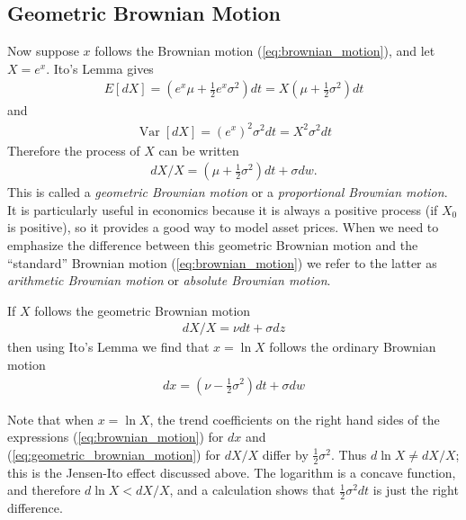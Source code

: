 \documentclass[\topdir/lecture\_notes.tex]{subfiles}
\begin{document}
\subsection{Geometric Brownian Motion}
Now suppose \(x\) follows the Brownian motion (\ref{eq:brownian_motion}), and let \(X=e^{x}\). Ito's Lemma gives
\begin{align*}
E[dX]=\left(e^{x} \mu+\frac{1}{2} e^{x} \sigma^{2}\right) dt=X\left(\mu+\frac{1}{2} \sigma^{2}\right) dt
\end{align*}
and
\begin{align*}
\operatorname{Var}[dX]=\left(e^{x}\right)^{2} \sigma^{2} dt=X^{2} \sigma^{2} dt
\end{align*}
Therefore the process of \(X\) can be written
\begin{align*}
dX / X=\left(\mu+\frac{1}{2} \sigma^{2}\right) dt+\sigma dw .
\end{align*}
This is called a \emph{geometric Brownian motion} or a \emph{proportional Brownian motion}. It is particularly useful in economics because it is always a positive process (if \(X_0\) is positive), so it provides a good way to model asset prices. When we need to emphasize the difference between this geometric Brownian motion and the ``standard'' Brownian motion (\ref{eq:brownian_motion}) we refer to the latter as \emph{arithmetic Brownian motion} or \emph{absolute Brownian motion}. 

If \(X\) follows the geometric Brownian motion
\begin{align}
dX / X=\nu dt+\sigma d z \label{eq:geometric_brownian_motion}
\end{align}
then using Ito's Lemma we find that \(x=\ln X\) follows the ordinary Brownian motion
\begin{align*}
dx=\left(\nu-\frac{1}{2} \sigma^{2}\right) dt+\sigma dw
\end{align*}

Note that when \(x=\ln X\), the trend coefficients on the right hand sides of the expressions (\ref{eq:brownian_motion}) for \(dx\) and (\ref{eq:geometric_brownian_motion}) for \(dX / X\) differ by \(\frac{1}{2} \sigma^{2}\). Thus \(d \ln X \neq dX / X\); this is the Jensen-Ito effect discussed above. The logarithm is a concave function, and therefore \(d \ln X<dX / X\), and a calculation shows that \(\frac{1}{2} \sigma^{2} dt\) is just the right difference.
\end{document}
